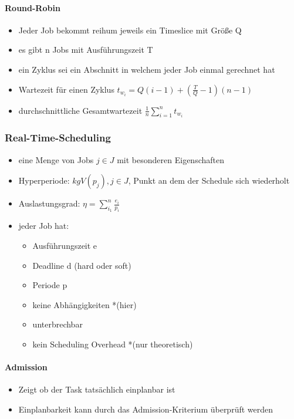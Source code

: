 \documentclass[12pt,a4paper]{article}
\begin{document}
\paragraph{Round-Robin}
\flushleft
\begin{itemize}
\item Jeder Job bekommt reihum jeweils ein Timeslice mit Größe Q
\item es gibt n Jobs mit Ausführungszeit T
\item ein Zyklus sei ein Abschnitt in welchem jeder Job einmal gerechnet hat
\item Wartezeit für einen Zyklus $t_{w_i} = Q(i-1)+(\frac{T}{Q}-1)(n-1)$
\item durchschnittliche Gesamtwartezeit $\frac{1}{n} \sum^n_{i=1} t_{w_i}$
\end{itemize}

\subsubsection{Real-Time-Scheduling}
\begin{itemize}
\item eine Menge von Jobs $j \in  J$ mit besonderen Eigenschaften
\item Hyperperiode: $kgV(p_j), j\in  J$, Punkt an dem der Schedule sich wiederholt
\item Auslastungsgrad: $\eta = \sum^n_{i_1} \frac{e_i}{p_i}$
\item jeder Job hat: 
\begin{itemize}
\item Ausführungszeit e
\item Deadline d (hard oder soft)
\item Periode p
\item keine Abhängigkeiten *(hier)
\item unterbrechbar
\item kein Scheduling Overhead *(nur theoretisch)

\end{itemize}
\end{itemize}
\paragraph{Admission}
\flushleft
\begin{itemize}
\item Zeigt ob der Task tatsächlich einplanbar ist
\item Einplanbarkeit kann durch das Admission-Kriterium überprüft werden
\end{itemize}
\end{document}
